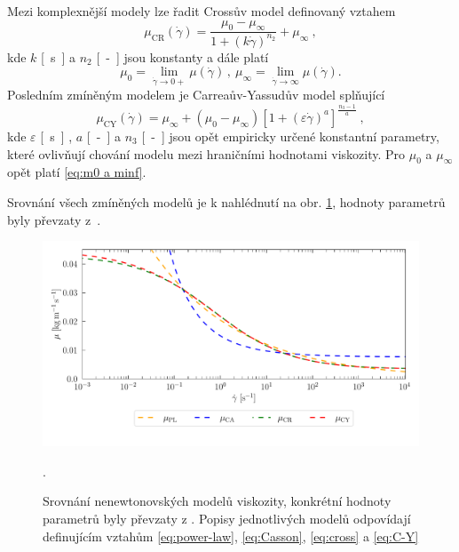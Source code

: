 Mezi komplexnější modely lze řadit Crossův model \cite{Sequeira} definovaný vztahem
\begin{equation}\label{eq:cross}
\mu _{\text{CR}} (\dot{\gamma}) = \frac{\mu_{0} - \mu_{\infty}}{1 + (k\dot{\gamma})^{n_2}} + \mu_{\infty}  \ ,
\end{equation}
kde $ k $ \si{[s]} a $ n_2 $ \si{[-]} jsou konstanty a dále platí
\begin{equation}\label{eq:m0 a minf}
\mu _{0}  = \lim_{\dot{\gamma} \rightarrow 0+}\mu (\dot{\gamma})\, , \ \mu_{\infty} = \lim_{\dot{\gamma} \rightarrow \infty}\mu (\dot{\gamma}).
\end{equation}
Posledním zmíněným modelem je Carreaův-Yassudův model \cite{Boyd2007} splňující
\begin{equation}\label{eq:C-Y}
\mu _{\text{CY}} (\dot{\gamma}) = \mu_{\infty} + (\mu_{0} - \mu_{\infty}) \left[ 1 + (\varepsilon \dot{\gamma}) ^{a} \right]^{\frac{n_3-1}{a}} \ ,
\end{equation}
kde $ \varepsilon$ \si{[s]} , $a$ \si{[-]} a $ n_3 $ \si{[-]} jsou opět empiricky určené konstantní parametry, které ovlivňují chování modelu mezi hraničními hodnotami viskozity. Pro $ \mu_{0}$ a $ \mu_{\infty} $ opět platí \eqref{eq:m0 a minf}.


Srovnání všech zmíněných modelů je k nahlédnutí na obr. \ref{fig:vs}, hodnoty parametrů byly převzaty z~\cite{Eichler2023}.

\begin{figure}[H]
	\centering
	\includegraphics[width=1.0\textwidth]{Images/modely.pdf}
	\vspace{-9mm}
	\caption{Srovnání nenewtonovských modelů viskozity, konkrétní hodnoty parametrů byly převzaty z \cite{Eichler2023}. Popisy jednotlivých modelů odpovídají definujícím vztahům
    \eqref{eq:power-law}, \eqref{eq:Casson}, \eqref{eq:cross} a \eqref{eq:C-Y}}.
	\label{fig:vs}
\end{figure}

